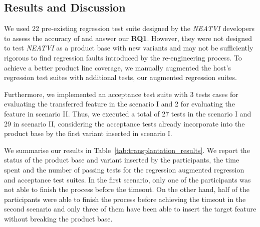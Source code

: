 \subsection{Results and Discussion}

We used 22 pre-existing regression test suite designed by the \emph{NEATVI} developers to assess the accuracy of \autoscalpel and answer our \textbf{RQ1}. However, they were not designed to test  \emph{NEATVI} as a product base with new variants and may not be sufficiently rigorous to find regression faults introduced by the re-engineering process. To achieve a better product line coverage, we manually augmented the host’s regression test suites with additional tests, our augmented regression suites. 

Furthermore, we implemented an acceptance test suite with 3 tests cases for evaluating the transferred feature in the scenario I and 2 for evaluating the feature in scenario II. Thus, we executed a total of 27 tests in the scenario I and 29 in scenario II, considering the acceptance tests already incorporate into the product base by the first variant inserted in scenario I. 

We summarise our results in Table~\ref{tab:transplantation_results}.  We report the status of the product base and variant inserted by the participants, the time spent and the number of passing tests for the regression augmented regression and acceptance test suites. In the first scenario, only one of the participants was not able to finish the process before the timeout. On the other hand, half of the participants were able to finish the process before achieving the timeout in the second scenario and only three of them have been able to insert the target feature without breaking the product base. 

